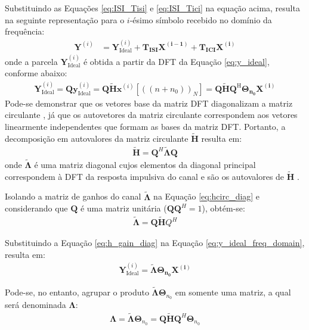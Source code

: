 Substituindo as Equações \ref{eq:ISI_Tisi} e  \ref{eq:ISI_Tici} na equação acima, resulta na seguinte representação para o $i$-ésimo símbolo recebido no domínio da frequência:
\begin{align}
\mathbf{Y}^{(i)} &=  \mathbf{Y}_\text{Ideal}^{(i)} + \mathbf{ T_\text{ISI}} \mathbf{X^{(i-1)}} + \mathbf{ T_\text{ICI} \mathbf{X^{(i)}}}\nonumber
\end{align}
onde a parcela $\mathbf{Y}_\text{Ideal}^{(i)}$ é obtida a partir da DFT da Equação \ref{eq:y_ideal}, conforme abaixo:
\begin{align}
\mathbf{Y}_\text{Ideal}^{(i)} = \mathbf{Q} \mathbf{y}_\text{Ideal}^{(i)}  = \mathbf{Q} \mathbf{ \tilde{H} } \mathbf{x}^{(i)}[((n + n_0))_N] = \mathbf{Q} \mathbf{ \tilde{H} } \mathbf{Q}^\text{H} \mathbf{\Theta_{n_0} \mathbf{X^{(i)}}}
\label{eq:y_ideal_freq_domain}  
\end{align}
Pode-se demonstrar que os vetores base da matriz DFT diagonalizam a matriz circulante \cite{malkin2009}, já que os autovetores da matriz circulante correspondem aos vetores linearmente independentes que formam as bases da matriz DFT. Portanto, a decomposição em autovalores da matriz circulante $\tilde{\mathbf{H}}$ resulta em:
\begin{align}
\tilde{\mathbf{H}} =  \mathbf{Q}^H \tilde{\mathbf{\Lambda}} \mathbf{Q}
\label{eq:hcirc_diag}
\end{align}
onde $\tilde{\mathbf{\Lambda}}$ é uma matriz diagonal cujos elementos da diagonal principal correspondem à DFT da resposta impulsiva do canal e são os autovalores de $\tilde{\mathbf{H}}$ \cite{gray2006}.

Isolando a matriz de ganhos do canal $\tilde{\mathbf{\Lambda}}$ na Equação \ref{eq:hcirc_diag} e considerando que $\mathbf{Q}$ é uma matriz unitária ($\mathbf{Q}\mathbf{Q}^H=1$), obtém-se:
\begin{align}
\tilde{\mathbf{\Lambda}} = \mathbf{Q}\tilde{\mathbf{H}}Q^H 
\label{eq:h_gain_diag}
\end{align}

Substituindo a Equação \ref{eq:h_gain_diag} na Equação \ref{eq:y_ideal_freq_domain}, resulta em:
\begin{align}
\mathbf{Y}_\text{Ideal}^{(i)} = \tilde{\mathbf{\Lambda}} \mathbf{\Theta_{n_0} \mathbf{X^{(i)}}}
\end{align}

Pode-se, no entanto, agrupar o produto $\tilde{\mathbf{\Lambda}}\mathbf{\Theta}_{n_0}$ em somente uma matriz, a qual será denominada $\mathbf{\Lambda}$:
\begin{align}
\mathbf{\Lambda}  = \tilde{\mathbf{\Lambda}}\mathbf{\Theta}_{n_0} = \mathbf{Q}\tilde{\mathbf{H}}\mathbf{Q}^H\mathbf{\Theta}_{n_0}
\label{eq:lambda_definition}
\end{align}

